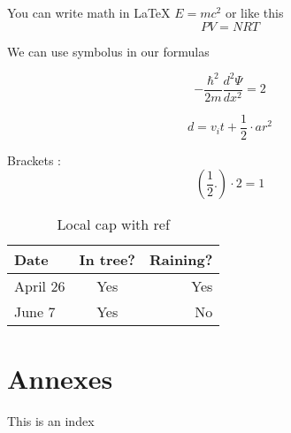 \documentclass[hidelinks]{article}
\begin{document}
You can write math in LaTeX $E = mc^2$ or like this $$PV = NRT$$

We can use symbolus in our formulas

$$-\frac{\hbar^2}{2m} \frac{d^2\Psi}{dx^2} = 2 $$

$$ d = v_it + \frac{1}{2} \cdot ar^2$$

Brackets : 
$$\left(    \frac{1}{2}.    \right)   \cdot 2 = 1 $$

\begin{table}[H]
	\centering
	\caption[Caption for this table]{Local cap with ref}
	\begin{tabular}{ l c r}
		\bfseries{Date} & In tree? & Raining? \\ \hline
		April 26 & Yes & Yes \\
		June 7 & Yes & No \\
	\end{tabular}
\end{table}
	
\cleardoublepage
	


\cleardoublepage



\appendix
\section {Annexes}
This is an index
\end{document}
